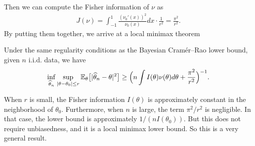 \documentclass[11pt,letterpaper]{article}
\numberwithin{theorem}{lecture}
\numberwithin{proposition}{lecture}
\numberwithin{lemma}{lecture}
\numberwithin{claim}{lecture}
\numberwithin{corollary}{lecture}
\numberwithin{definition}{lecture}
\numberwithin{conjecture}{lecture}
\numberwithin{remark}{lecture}
\numberwithin{example}{lecture}
\numberwithin{equation}{lecture}
\begin{document}
Then we can compute the Fisher information of $\nu$ as
\begin{align*}
  J(\nu) = \int_{-1}^1 \frac{(\nu_0' (x))^2}{\nu_0 (x)} dx \cdot \frac{1}{r^2} = \frac{\pi^2}{r^2}.
\end{align*}
By putting them together, we arrive at a local minimax theorem
\begin{theorem}\label{thm:local-minimax-lower-bound}
  Under the same regularity conditions as the Bayesian Cram\'{e}r--Rao lower bound, given $n$ i.i.d. data, we have
  \begin{align*}
    \inf_{\widehat{\theta}_n} \sup_{|\theta - \theta_0| \leq r} {\mathbb{E}}_\theta \big[ |\widehat{\theta}_n - \theta|^2 \big] \geq \Big( n \int I (\theta) \nu (\theta) d \theta + \frac{\pi^2}{r^2} \Big)^{-1}.
  \end{align*}
\end{theorem}
When $r$ is small, the Fisher information $I(\theta)$ is approximately constant in the neighborhood of $\theta_0$. Furthermore, when $n$ is large, the term $\pi^2 / r^2$ is negligible. In that case, the lower bound is approximately $1 / (n I(\theta_0))$. But this does not require unbiasedness, and it is a local minimax lower bound. So this is a very general result.
\end{document}
